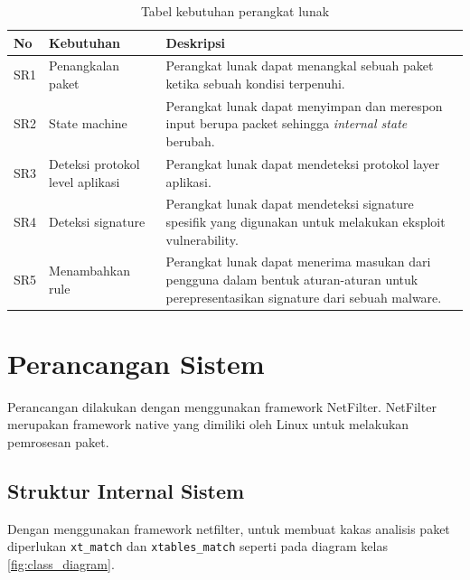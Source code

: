 \begin{table}[H]
	\caption{Tabel kebutuhan perangkat lunak}
	\label{table:software_requirement}
	\begin{tabularx}{\textwidth}{|l|X|X|}
		\hline
		\textbf{No} & \textbf{Kebutuhan} & \textbf{Deskripsi} \\ \hline
		SR1 & Penangkalan paket & Perangkat lunak dapat menangkal sebuah paket ketika sebuah kondisi terpenuhi. \\ \hline 
		SR2 & State machine & Perangkat lunak dapat menyimpan dan merespon input berupa packet sehingga \textit{internal state} berubah. \\ \hline
		SR3 & Deteksi protokol level aplikasi & Perangkat lunak dapat mendeteksi protokol layer aplikasi. \\ \hline
		SR4 & Deteksi signature & Perangkat lunak dapat mendeteksi signature spesifik yang digunakan untuk melakukan eksploit vulnerability.\\ \hline
		SR5 & Menambahkan rule & Perangkat lunak dapat menerima masukan dari pengguna dalam bentuk aturan-aturan untuk perepresentasikan signature dari sebuah malware.\\ \hline
	\end{tabularx}
\end{table}

\section{Perancangan Sistem}

Perancangan dilakukan dengan menggunakan framework NetFilter. NetFilter merupakan framework native yang dimiliki oleh Linux untuk melakukan pemrosesan paket.

\subsection{Struktur Internal Sistem}

Dengan menggunakan framework netfilter, untuk membuat kakas analisis paket diperlukan \verb|xt_match| dan \verb|xtables_match| seperti pada diagram kelas \ref{fig:class_diagram}.

